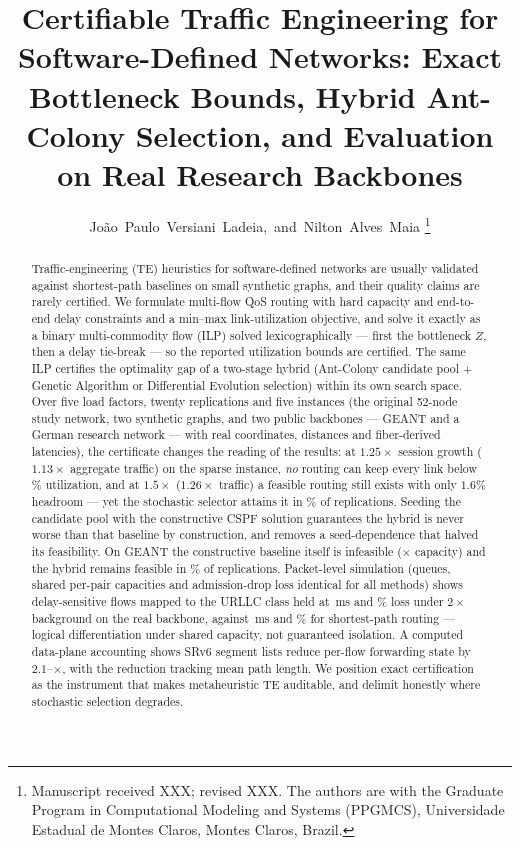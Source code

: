 \documentclass[journal]{IEEEtran}
\begin{document}
\title{Certifiable Traffic Engineering for Software-Defined Networks: Exact
Bottleneck Bounds, Hybrid Ant-Colony Selection, and Evaluation on Real
Research Backbones}
\author{João~Paulo~Versiani~Ladeia,~and~Nilton~Alves~Maia%
\thanks{Manuscript received XXX; revised XXX. The authors are with the
Graduate Program in Computational Modeling and Systems (PPGMCS),
Universidade Estadual de Montes Claros, Montes Claros, Brazil.}}


\maketitle

\begin{abstract}
Traffic-engineering (TE) heuristics for software-defined networks are usually
validated against shortest-path baselines on small synthetic graphs, and
their quality claims are rarely certified. We formulate multi-flow QoS
routing with hard capacity and end-to-end delay constraints and a min--max
link-utilization objective, and solve it exactly as a binary multi-commodity
flow (ILP) solved lexicographically --- first the bottleneck $Z$, then a
delay tie-break --- so the reported utilization bounds are certified. The
same ILP certifies the optimality gap of a two-stage hybrid (Ant-Colony
candidate pool $+$ Genetic Algorithm or Differential Evolution selection)
within its own search space. Over five load factors, twenty replications and
five instances (the original 52-node study network, two synthetic graphs, and
two public backbones --- GEANT and a German research network --- with real
coordinates, distances and fiber-derived latencies), the certificate changes
the reading of the results: at $1.25\times$ session growth ($1.13\times$
aggregate traffic) on the sparse instance, \emph{no} routing can keep every
link below \IlpZmaiaHighPct\% utilization, and at $1.5\times$ ($1.26\times$
traffic) a feasible routing still exists with only $1.6\%$ headroom --- yet
the stochastic selector attains it in \GaFeasMaiaMax\% of replications.
Seeding the candidate pool with the constructive CSPF solution guarantees the
hybrid is never worse than that baseline by construction, and removes a
seed-dependence that halved its feasibility. On GEANT the constructive
baseline itself is infeasible (\AntCspfMaxUtil$\times$ capacity) and the
hybrid remains feasible in \AntGaFeas\% of replications. Packet-level
simulation (queues, shared per-pair capacities and admission-drop loss
identical for all methods) shows delay-sensitive flows mapped to the URLLC
class held at \GerDoptTwo\,ms and \GerLossOptTwo\% loss under $2\times$
background on the real backbone, against \GerDdjTwo\,ms and \GerLossDjTwo\%
for shortest-path routing --- logical differentiation under shared capacity,
not guaranteed isolation. A computed data-plane accounting shows SRv6 segment
lists reduce per-flow forwarding state by $2.1$--\SrvRedMaia$\times$, with
the reduction tracking mean path length. We position exact certification as
the instrument that makes metaheuristic TE auditable, and delimit honestly
where stochastic selection degrades.
\end{abstract}
\end{document}
